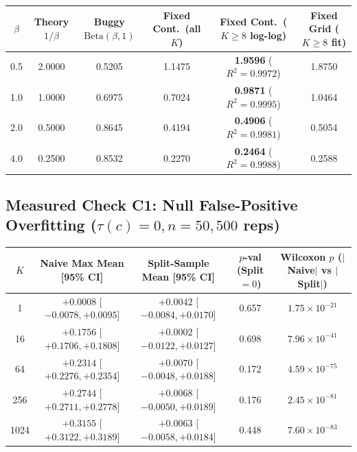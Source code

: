 \documentclass[11pt]{article}
\begin{document}
{\footnotesize\setlength{\tabcolsep}{3.5pt}
\begin{center}
\begin{tabular}{@{}cccccc@{}}
\toprule
$\beta$ & Theory $1/\beta$ & Buggy $\mathrm{Beta}(\beta,1)$ & Fixed Cont.\ (all $K$) & Fixed Cont.\ ($K \ge 8$ log-log) & Fixed Grid ($K \ge 8$ fit) \\
\midrule
0.5 & 2.0000 & 0.5205 & 1.1475 & \textbf{1.9596} ($R^2=0.9972$) & 1.8750 \\
1.0 & 1.0000 & 0.6975 & 0.7024 & \textbf{0.9871} ($R^2=0.9995$) & 1.0464 \\
2.0 & 0.5000 & 0.8645 & 0.4194 & \textbf{0.4906} ($R^2=0.9981$) & 0.5054 \\
4.0 & 0.2500 & 0.8532 & 0.2270 & \textbf{0.2464} ($R^2=0.9988$) & 0.2588 \\
\bottomrule
\end{tabular}
\end{center}
}

\subsection{\texorpdfstring{Measured Check C1: Null False-Positive Overfitting ($\tau(c)=0, n=50, 500$ reps)}{Null false-positive rates}}

{\footnotesize\setlength{\tabcolsep}{3.5pt}
\begin{center}
\begin{tabular}{@{}ccccc@{}}
\toprule
$K$ & Naive Max Mean [95\% CI] & Split-Sample Mean [95\% CI] & $p$-val (Split $= 0$) & Wilcoxon $p$ ($|$Naive$|$ vs $|$Split$|$) \\
\midrule
1 & $+0.0008$ [$-0.0078, +0.0095$] & $+0.0042$ [$-0.0084, +0.0170$] & 0.657 & $1.75\times 10^{-21}$ \\
16 & $+0.1756$ [$+0.1706, +0.1808$] & $+0.0002$ [$-0.0122, +0.0127$] & 0.698 & $7.96\times 10^{-41}$ \\
64 & $+0.2314$ [$+0.2276, +0.2354$] & $+0.0070$ [$-0.0048, +0.0188$] & 0.172 & $4.59\times 10^{-75}$ \\
256 & $+0.2744$ [$+0.2711, +0.2778$] & $+0.0068$ [$-0.0050, +0.0189$] & 0.176 & $2.45\times 10^{-81}$ \\
1024 & \textbf{$+0.3155$} [$+0.3122, +0.3189$] & \textbf{$+0.0063$} [$-0.0058, +0.0184$] & 0.448 & $7.60\times 10^{-83}$ \\
\bottomrule
\end{tabular}
\end{center}
}
\end{document}
